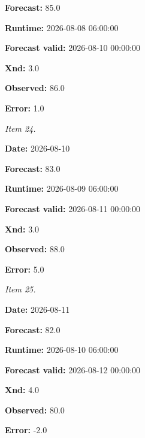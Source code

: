 \documentclass[11pt]{article}
\begin{document}
\par\noindent\textbf{Forecast:} 85.0

\par\noindent\textbf{Runtime:} 2026-08-08 06:00:00

\par\noindent\textbf{Forecast valid:} 2026-08-10 00:00:00

\par\noindent\textbf{Xnd:} 3.0

\par\noindent\textbf{Observed:} 86.0

\par\noindent\textbf{Error:} 1.0

\par\noindent\textit{Item 24.}\par \par\noindent\textbf{Date:} 2026-08-10

\par\noindent\textbf{Forecast:} 83.0

\par\noindent\textbf{Runtime:} 2026-08-09 06:00:00

\par\noindent\textbf{Forecast valid:} 2026-08-11 00:00:00

\par\noindent\textbf{Xnd:} 3.0

\par\noindent\textbf{Observed:} 88.0

\par\noindent\textbf{Error:} 5.0

\par\noindent\textit{Item 25.}\par \par\noindent\textbf{Date:} 2026-08-11

\par\noindent\textbf{Forecast:} 82.0

\par\noindent\textbf{Runtime:} 2026-08-10 06:00:00

\par\noindent\textbf{Forecast valid:} 2026-08-12 00:00:00

\par\noindent\textbf{Xnd:} 4.0

\par\noindent\textbf{Observed:} 80.0

\par\noindent\textbf{Error:} -2.0
\end{document}
